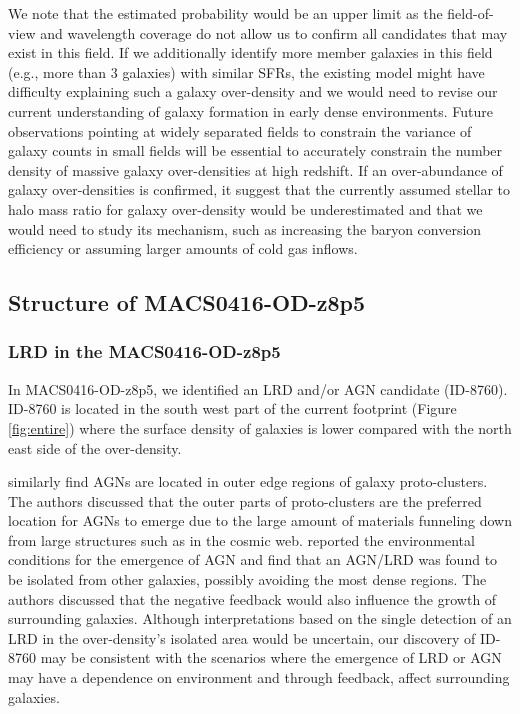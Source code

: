 \documentclass[twocolumn]{aastex631}
\begin{document}
We note that the estimated probability would be an upper limit as the field-of-view and wavelength coverage do not allow us to confirm all candidates that may exist in this field. If we additionally identify more member galaxies in this field (e.g., more than $3$ galaxies) with similar SFRs, the existing model might have difficulty explaining such a galaxy over-density and we would need to revise our current understanding of galaxy formation in early dense environments. 
Future observations pointing at widely separated fields to constrain the variance of galaxy counts in small fields will be essential to accurately constrain the number density of massive galaxy over-densities at high redshift. 
If an over-abundance of galaxy over-densities is confirmed, it suggest that the currently assumed stellar to halo mass ratio for galaxy over-density would be underestimated and that we would need to study its mechanism, such as increasing the baryon conversion efficiency or assuming larger amounts of cold gas inflows.

\subsection{Structure of MACS0416-OD-z8p5}
\label{sec:extent}

\subsubsection{LRD in the MACS0416-OD-z8p5}
\label{sec:AGN}
In MACS0416-OD-z8p5, we identified an LRD and/or AGN candidate (ID-8760). ID-8760 is  located in the south west part of the current footprint (Figure \ref{fig:entire}) where the surface density of galaxies is lower compared with the north east side of the over-density.

\citet{Champagne2024a} similarly find AGNs are located in outer edge regions of galaxy proto-clusters. The authors discussed that the outer parts of proto-clusters are the preferred location for AGNs to emerge due to the large amount of materials funneling down from large structures such as in the cosmic web. \citet{Morishita2023} reported the environmental conditions for the emergence of AGN and find that an AGN/LRD was found to be isolated from other galaxies, possibly avoiding the most dense regions. The authors discussed that the negative feedback would also influence the growth of surrounding galaxies. 
Although interpretations based on the single detection of an LRD in the over-density's isolated area would be uncertain,  our discovery of ID-8760 may be consistent with the scenarios where the emergence of LRD or AGN may have a dependence on environment and through feedback, affect surrounding galaxies.
\end{document}
